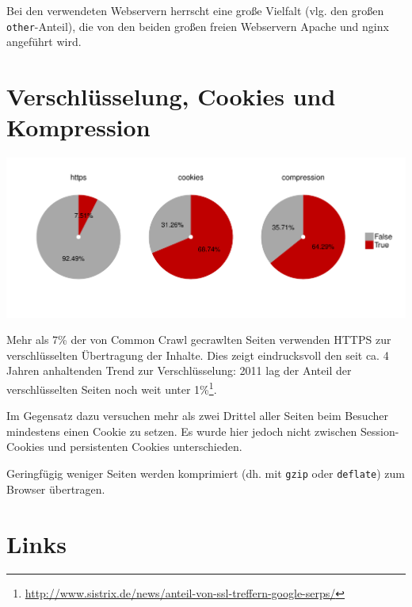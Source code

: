 \documentclass[a4paper,12pt,titlepage=false]{scrreprt}
\begin{document}
\noindent
Bei den verwendeten Webservern herrscht eine große Vielfalt (vlg. den großen \texttt{other}-Anteil), die von den beiden großen freien Webservern Apache und nginx angeführt wird.

\section{Verschlüsselung, Cookies und Kompression}

\begin{center}
    \includegraphics[trim=0 2cm 0 .5cm, clip=true, width=.9\textwidth]{plots/plot_boolean_pie}
\end{center}

\noindent
Mehr als 7\% der von Common Crawl gecrawlten Seiten verwenden HTTPS zur verschlüsselten Übertragung der Inhalte. Dies zeigt eindrucksvoll den seit ca. 4 Jahren anhaltenden Trend zur Verschlüsselung: 2011 lag der Anteil der verschlüsselten Seiten noch weit unter 1\%\footnote{%
\url{http://www.sistrix.de/news/anteil-von-ssl-treffern-google-serps/}}.

Im Gegensatz dazu versuchen mehr als zwei Drittel aller Seiten beim Besucher mindestens einen Cookie zu setzen. Es wurde hier jedoch nicht zwischen Session-Cookies und persistenten Cookies unterschieden.

Geringfügig weniger Seiten werden komprimiert (dh. mit \texttt{gzip} oder \texttt{deflate}) zum Browser übertragen.

\section{Links}
\end{document}
